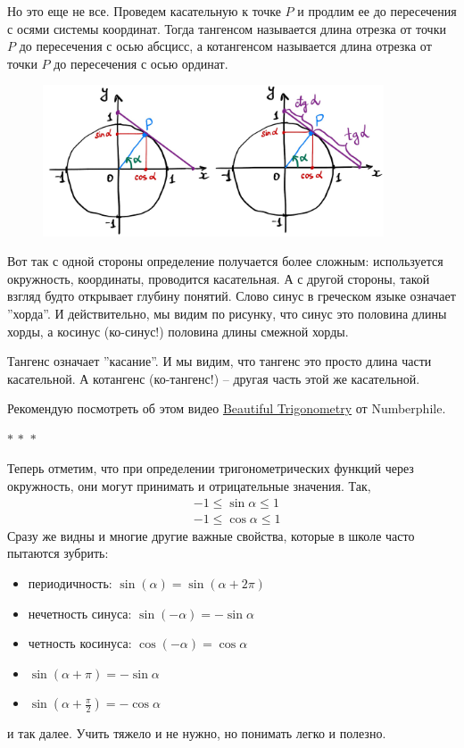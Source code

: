 \documentclass[a4paper,12pt]{article}
\renewcommand{\le}{\leqslant}
\newcommand{\threestars}{\begin{center}$ {\ast}\,{\ast}\,{\ast} $\end{center}}
\newcounter{z-counter}
\newcounter{th-counter}
\begin{document}
Но это еще не все. Проведем касательную к точке $P$ и продлим ее до пересечения с осями системы координат. Тогда тангенсом называется длина отрезка от точки $P$ до пересечения с осью абсцисс, а котангенсом называется длина отрезка от точки $P$ до пересечения с осью ординат.

\begin{figure}[H]
    \centering
    \includegraphics[width=0.9\textwidth]{pictures/pct_sin_cos_2.jpg}
\end{figure}

Вот так с одной стороны определение получается более сложным: используется окружность, координаты, проводится касательная. А с другой стороны, такой взгляд будто открывает глубину понятий. Слово синус в греческом языке означает ''хорда''. И действительно, мы видим по рисунку, что синус это половина длины хорды, а косинус (ко-синус!) половина длины смежной хорды.

Тангенс означает ''касание''. И мы видим, что тангенс это просто длина части касательной. А котангенс (ко-тангенс!) -- другая часть этой же касательной.

Рекомендую посмотреть об этом видео \href{https://youtu.be/snHKEpCv0Hk?si=6_w2j3Dbjdi4dpH5}{Beautiful Trigonometry} от Numberphile.

\threestars

Теперь отметим, что при определении тригонометрических функций через окружность, они могут принимать и отрицательные значения. Так,
\begin{align*}
    &-1 \le \sin \alpha \le 1\\
    &-1 \le \cos \alpha \le 1
\end{align*}
Сразу же видны и многие другие важные свойства, которые в школе часто пытаются зубрить:
\begin{itemize}
    \item периодичность: $\sin(\alpha) = \sin(\alpha + 2\pi)$
    \item нечетность синуса: $\sin(-\alpha) = - \sin \alpha$
    \item четность косинуса: $\cos(-\alpha) = \cos \alpha$
    \item $\sin(\alpha + \pi) = -\sin \alpha$
    \item $\sin(\alpha + \frac{\pi}{2}) = -\cos \alpha$
\end{itemize}
и так далее. Учить тяжело и не нужно, но понимать легко и полезно.
\end{document}
